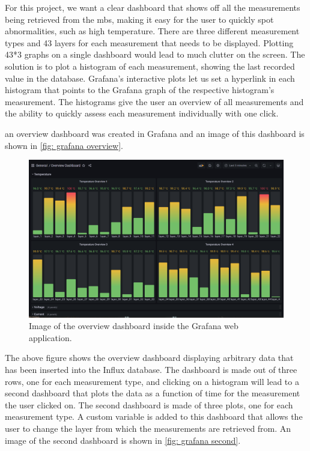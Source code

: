 \documentclass[main.tex]{subfiles}
\begin{document}
For this project, we want a clear dashboard that shows off all the measurements being retrieved from the \gls{mb}s, making it easy for the user to quickly spot abnormalities, such as high temperature. There are three different measurement types and 43 layers for each measurement that needs to be displayed. Plotting 43*3 graphs on a single dashboard would lead to much clutter on the screen. The solution is to plot a histogram of each measurement, showing the last recorded value in the database. Grafana's interactive plots let us set a hyperlink in each histogram that points to the Grafana graph of the respective histogram's measurement. The histograms give the user an overview of all measurements and the ability to quickly assess each measurement individually with one click.

an overview dashboard was created in Grafana and an image of this dashboard is shown in \autoref{fig: grafana overview}.

\begin{figure}[!htpb]
    \centering
    \includegraphics[width=16cm, scale=4]{images/grafana_overview.png}
    \caption{Image of the overview dashboard inside the Grafana web application.}
    \label{fig: grafana overview}
\end{figure}
\FloatBarrier

The above figure shows the overview dashboard displaying arbitrary data that has been inserted into the Influx database. The dashboard is made out of three rows, one for each measurement type, and clicking on a histogram will lead to a second dashboard that plots the data as a function of time for the measurement the user clicked on. The second dashboard is made of three plots, one for each measurement type. A custom variable is added to this dashboard that allows the user to change the layer from which the measurements are retrieved from. An image of the second dashboard is shown in \autoref{fig: grafana second}.
\end{document}
